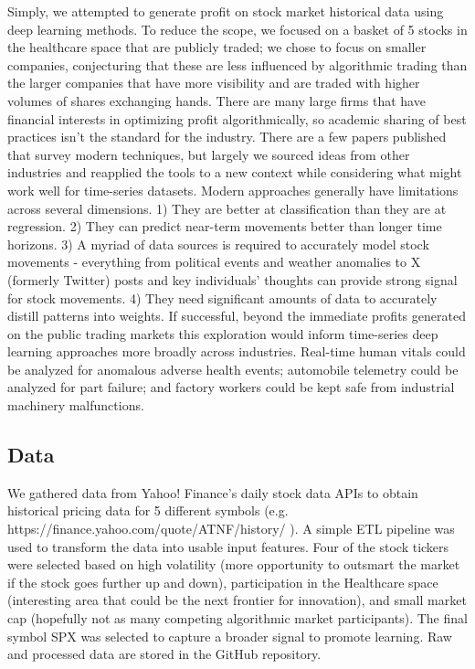 \documentclass[10pt,twocolumn,letterpaper]{article}
\begin{document}
Simply, we attempted to generate profit on stock market historical data using deep learning methods. To reduce the scope, we focused on a basket of 5 stocks in the healthcare space that are publicly traded; we chose to focus on smaller companies, conjecturing that these are less influenced by algorithmic trading than the larger companies that have more visibility and are traded with higher volumes of shares exchanging hands. 
There are many large firms that have financial interests in optimizing profit algorithmically, so academic sharing of best practices isn’t the standard for the industry. There are a few papers published that survey modern techniques, but largely we sourced ideas from other industries and reapplied the tools to a new context while considering what might work well for time-series datasets.
Modern approaches generally have limitations across several dimensions. 1) They are better at classification than they are at regression. 2) They can predict near-term movements better than longer time horizons. 3) A myriad of data sources is required to accurately model stock movements - everything from political events and weather anomalies to X (formerly Twitter) posts and key individuals’ thoughts can provide strong signal for stock movements. 4) They need significant amounts of data to accurately distill patterns into weights.
If successful, beyond the immediate profits generated on the public trading markets this exploration would inform time-series deep learning approaches more broadly across industries. Real-time human vitals could be analyzed for anomalous adverse health events; automobile telemetry could be analyzed for part failure; and factory workers could be kept safe from industrial machinery malfunctions.



\subsection{Data}

We gathered data from Yahoo! Finance’s daily stock data APIs to obtain historical pricing data for 5 different symbols (e.g. https://finance.yahoo.com/quote/ATNF/history/ \cite{we should just cite yfinance or yahoo website here imo}). A simple ETL pipeline was used to transform the data into usable input features. Four of the stock tickers were selected based on high volatility (more opportunity to outsmart the market if the stock goes further up and down), participation in the Healthcare space (interesting area that could be the next frontier for innovation), and small market cap (hopefully not as many competing algorithmic market participants). The final symbol SPX was selected to capture a broader signal to promote learning. Raw and processed data are stored in the GitHub repository.
\end{document}

